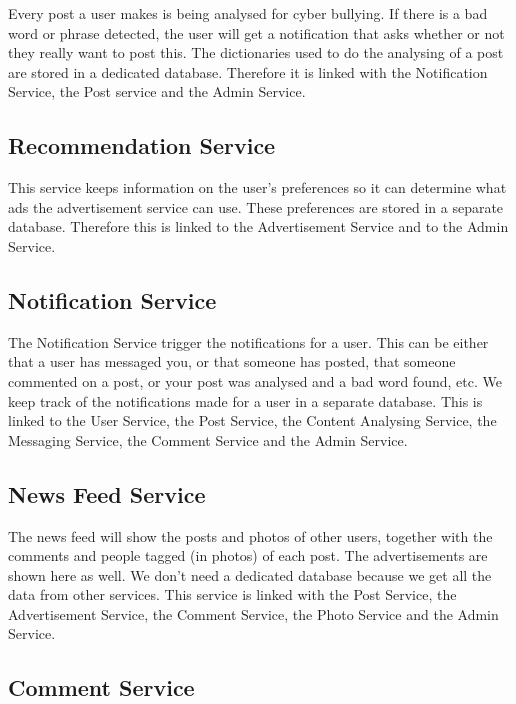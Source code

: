 \documentclass[a4paper,12pt]{article}
\begin{document}
Every post a user makes is being analysed for cyber bullying. If there is a bad word or phrase detected, the user will get a notification that asks whether or not they really want to post this. The dictionaries used to do the analysing of a post are stored in a dedicated database.
\newline
\newline
Therefore it is linked with the Notification Service, the Post service and the Admin Service.

\subsection{Recommendation Service}

This service keeps information on the user's preferences so it can determine what ads the advertisement service can use. These preferences are stored in a separate database. Therefore this is linked to the Advertisement Service and to the Admin Service.

\subsection{Notification Service}

The Notification Service trigger the notifications for a user. This can be either that a user has messaged you, or that someone has posted, that someone commented on a post, or your post was analysed and a bad word found, etc. We keep track of the notifications made for a user in a separate database.
\newline
\newline
This is linked to the User Service, the Post Service, the Content Analysing Service, the Messaging Service, the Comment Service and the Admin Service.

\subsection{News Feed Service}

The news feed will show the posts and photos of other users, together with the comments and people tagged (in photos) of each post. The advertisements are shown here as well. We don't need a dedicated database because we get all the data from other services. This service is linked with the Post Service, the Advertisement Service, the Comment Service, the Photo Service and the Admin Service.

\subsection{Comment Service}
\end{document}
